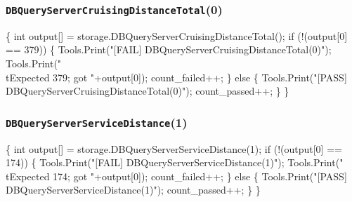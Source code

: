 \documentclass{article}
\def\nwendcode{\endtrivlist \endgroup}
\let\nwdocspar=\par
\begin{document}
\subsubsection{{\tt{}DBQueryServerCruisingDistanceTotal}(0)}
\nwenddocs{}\endmoddef{}
\{
  int output[] = storage.DBQueryServerCruisingDistanceTotal();
  if (!(output[0] == 379)) \{
    Tools.Print("[FAIL] DBQueryServerCruisingDistanceTotal(0)");
    Tools.Print("\\tExpected 379; got "+output[0]);
    count_failed++;
  \} else \{
    Tools.Print("[PASS] DBQueryServerCruisingDistanceTotal(0)");
    count_passed++;
  \}
\}
\nwendcode{}\nwdocspar
\subsubsection{{\tt{}DBQueryServerServiceDistance}(1)}
\nwenddocs{}\endmoddef{}
\{
  int output[] = storage.DBQueryServerServiceDistance(1);
  if (!(output[0] == 174)) \{
    Tools.Print("[FAIL] DBQueryServerServiceDistance(1)");
    Tools.Print("\\tExpected 174; got "+output[0]);
    count_failed++;
  \} else \{
    Tools.Print("[PASS] DBQueryServerServiceDistance(1)");
    count_passed++;
  \}
\}
\nwendcode{}\nwdocspar
\end{document}
